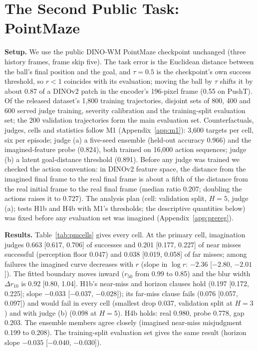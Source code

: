 \documentclass[10pt]{article}
\begin{document}
\section{The Second Public Task: PointMaze}
\label{app:pm}

\textbf{Setup.} We use the public DINO-WM PointMaze checkpoint unchanged (three history frames, frame skip five). The task error is the Euclidean distance between the ball's final position and the goal, and $\tau=0.5$ is the checkpoint's own success threshold, so $r<1$ coincides with its evaluation; moving the ball by $\tau$ shifts it by about 0.87 of a DINOv2 patch in the encoder's 196-pixel frame (0.55 on PushT). Of the released dataset's 1,800 training trajectories, disjoint sets of 800, 400 and 600 served judge training, severity calibration and the training-split evaluation set; the 200 validation trajectories form the main evaluation set. Counterfactuals, judges, cells and statistics follow M1 (Appendix~\ref{app:m1}): 3,600 targets per cell, six per episode; judge (a) a five-seed ensemble (held-out accuracy 0.966) and the imagined-feature probe (0.824), both trained on 16,000 action sequences; judge (b) a latent goal-distance threshold (0.891). Before any judge was trained we checked the action convention: in DINOv2 feature space, the distance from the imagined final frame to the real final frame is about a fifth of the distance from the real initial frame to the real final frame (median ratio 0.207; doubling the actions raises it to 0.727). The analysis plan (cell: validation split, $H=5$, judge (a); tests H1b and H4b with M1's thresholds; the descriptive quantities below) was fixed before any evaluation set was imagined (Appendix~\ref{app:prereg}).

\textbf{Results.} Table~\ref{tab:pmcells} gives every cell. At the primary cell, imagination judges 0.663 [0.617, 0.706] of successes and 0.201 [0.177, 0.227] of near misses successful (perception floor 0.047) and 0.038 [0.019, 0.058] of far misses; among failures the imagined curve decreases with $r$ (slope in $\log r$: $-2.36$ [$-2.80$, $-2.01$]). The fitted boundary moves inward ($r_{50}$ from 0.99 to 0.85) and the blur width $\Delta r_{10}$ is 0.92 [0.80, 1.04]. H1b's near-miss and horizon clauses hold (0.197 [0.172, 0.225]; slope $-0.033$ [$-0.037$, $-0.028$]); its far-miss clause fails (0.076 [0.057, 0.097]) and would fail in every cell (smallest drop 0.037, validation split at $H=3$) and with judge (b) (0.098 at $H=5$). H4b holds: real 0.980, probe 0.778, gap 0.203. The ensemble members agree closely (imagined near-miss misjudgment 0.199 to 0.208). The training-split evaluation set gives the same result (horizon slope $-0.035$ [$-0.040$, $-0.030$]).
\end{document}

